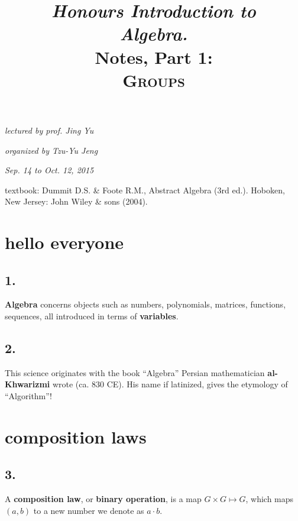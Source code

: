 \documentclass[12pt]{article}
\newcommand\M\cdot%
\newcommand\X\times%
\newcommand\Mp\mapsto%
\newcommand{\Ss}[1]{\textsf{\textbf{#1}}}%
\begin{document}
\title{
 \textit{Honours Introduction to} \\
 \textit{\textbf{\Huge Algebra.}} \\
 Notes, Part 1: \\
 \huge\textsc{Groups}
}
\date{}
\author{}
\maketitle
\allowdisplaybreaks[4]%

\vspace{-3.3cm} %
\hfill{\itshape lectured by prof. Jing Yu} \par
\hfill{\itshape organized by Tzu-Yu Jeng} \par
\hfill{\itshape Sep. 14 to Oct. 12, 2015} \\
\vspace{-0.1cm} 

textbook: Dummit D.S. \& Foote R.M., Abstract Algebra (3rd ed.). Hoboken, New Jersey: John Wiley \& sons (2004). \par
[Herstein I.N., Topic in Algebra (2nd ed.). Hoboken, New Jersey: John Wiley \& sons (2004).] \par
[Fraleigh J.B., A first Course in Abstract Algebra (7th ed.). Boston, Massachusetts: Addison-Wesley (2003).]

\section{hello everyone} 
\subsection*{1.} \Ss{Algebra} concerns objects such as numbers, polynomials, matrices, functions, sequences, all introduced in terms of \Ss{variables}.

\subsection*{2.} This science  originates with the book ``Algebra'' Persian mathematician \Ss{al-Khwarizmi} wrote (ca. 830 CE). 
His name if latinized, gives the etymology of ``Algorithm''!

\section{composition laws} 
\subsection*{3.} A \Ss{composition law}, or \Ss{binary operation}, is a map \(G \X G \Mp G\), which maps \((a, b)\) to a new number we denote as \(a \M b\).
\end{document}

